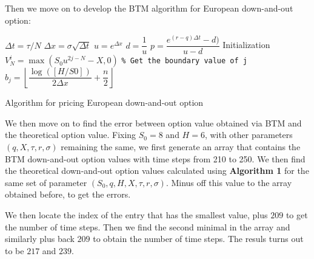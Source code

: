 \newpage

Then we move on to develop the BTM algorithm for European down-and-out option:

\begin{algorithm}[H]
 $\Delta t = \tau / N$\;
 $\Delta x = \sigma \sqrt{\Delta t}$\;
 $u = e^{\Delta x}$\;
 $d = \dfrac{1}{u}$\;
 $p = \dfrac{e^{(r-q)\Delta t} - d)}{u - d}$\;
 Initialization\;
  {
  $V_{N}^{i} = \max(S_0u^{2j - N} - X, 0)$\;
 }
  {
  \texttt{\% Get the boundary value of j}\;
  $b_j =\left \lfloor \dfrac{\log([H/S0])}{2 \Delta x}+ \dfrac{n}{2}\right\rfloor$\;
 	 {
 	}
 }
\caption{Algorithm for pricing European down-and-out option}
\end{algorithm}

We then move on to find the error between option value obtained via BTM and the theoretical option value. Fixing $S_0 = 8$ and $H = 6$, with other parameters $(q, X, \tau, r, \sigma)$ remaining the same, we first generate an array that contains the BTM down-and-out option values with time steps from 210 to 250. We then find the theoretical down-and-out option values calculated using \textbf{Algorithm 1} for the same set of parameter $(S_0, q, H, X, \tau, r, \sigma)$. Minus off this value to the array obtained before, to get the errors.

We then locate the index of the entry that has the smallest value, plus $209$ to get the number of time steps. Then we find the second minimal in the array and similarly plus back $209$ to obtain the number of time steps. The resuls turns out to be $217$ and $239$.

\newpage

